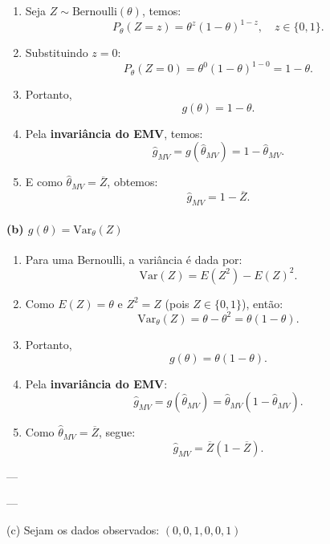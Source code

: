 \begin{enumerate}
  \item Seja \(Z \sim \mathrm{Bernoulli}(\theta)\), temos:
  \[
  P_\theta(Z=z)=\theta^z(1-\theta)^{1-z}, \quad z \in \{0,1\}.
  \]

  \item Substituindo \(z=0\):
  \[
  P_\theta(Z=0)=\theta^0(1-\theta)^{1-0}=1-\theta.
  \]

  \item Portanto,
  \[
  g(\theta)=1-\theta.
  \]

  \item Pela \textbf{invariância do EMV}, temos:
  \[
  \widehat g_{MV}=g(\widehat\theta_{MV})=1-\widehat\theta_{MV}.
  \]

  \item E como \(\widehat\theta_{MV}=\overline Z\), obtemos:
  \[
  \boxed{\widehat g_{MV}=1-\overline Z.}
  \]
\end{enumerate}

\vspace{1em}

\paragraph{(b) \(g(\theta)=\mathrm{Var}_\theta(Z)\)}

\begin{enumerate}
  \item Para uma Bernoulli, a variância é dada por:
  \[
  \mathrm{Var}(Z)=E(Z^2)-E(Z)^2.
  \]

  \item Como \(E(Z)=\theta\) e \(Z^2=Z\) (pois \(Z\in\{0,1\}\)), então:
  \[
  \mathrm{Var}_\theta(Z)=\theta-\theta^2=\theta(1-\theta).
  \]

  \item Portanto,
  \[
  g(\theta)=\theta(1-\theta).
  \]

  \item Pela \textbf{invariância do EMV}:
  \[
  \widehat g_{MV}=g(\widehat\theta_{MV})
  =\widehat\theta_{MV}(1-\widehat\theta_{MV}).
  \]

  \item Como \(\widehat\theta_{MV}=\overline Z\), segue:
  \[
  \boxed{\widehat g_{MV}=\overline Z(1-\overline Z).}
  \]
\end{enumerate}

---


---

(c) Sejam os dados observados: \( (0, 0, 1, 0, 0, 1) \)

